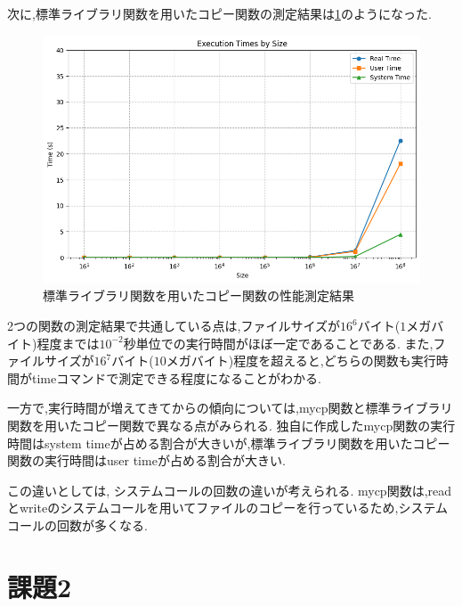 \documentclass[autodetect-engine, dvi=dvipdfmx, 10pt, a4paper, ja=standard]{bxjsarticle}
\begin{document}
次に,標準ライブラリ関数を用いたコピー関数の測定結果は\ref{fig:ex-1-stdio}のようになった.

\begin{figure}[H]
	\centering
	\includegraphics[width=0.8\linewidth]{./syscp.png}
	\caption{標準ライブラリ関数を用いたコピー関数の性能測定結果}
	\label{fig:ex-1-stdio}
\end{figure}

2つの関数の測定結果で共通している点は,ファイルサイズが$16^6$バイト($1$メガバイト)程度までは$10^{-2}$秒単位での実行時間がほぼ一定であることである.
また,ファイルサイズが$16^7$バイト($10$メガバイト)程度を超えると,どちらの関数も実行時間がtimeコマンドで測定できる程度になることがわかる.

一方で,実行時間が増えてきてからの傾向については,mycp関数と標準ライブラリ関数を用いたコピー関数で異なる点がみられる.
独自に作成したmycp関数の実行時間はsystem timeが占める割合が大きいが,標準ライブラリ関数を用いたコピー関数の実行時間はuser timeが占める割合が大きい.

この違いとしては, システムコールの回数の違いが考えられる.
mycp関数は,readとwriteのシステムコールを用いてファイルのコピーを行っているため,システムコールの回数が多くなる.





\section{課題2}
\label{sec:ex-2}




\end{document}
